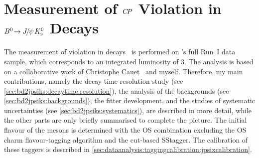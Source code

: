 
\chapter[Measurement of \texorpdfstring{$\CP$}{CP} Violation in
\texorpdfstring{$\BdToJPsiKS$}{Bd2JPsiKS} Decays]{Measurement of
\texorpdfstring{$\CP$}{CP} Violation in
\texorpdfstring{$\BdToJPsiKS$}{Bd2JPsiKS} Decays}
\label{sec:bd2jpsiks}

The measurement of \CP violation in \BdToJPsiKS
decays~\cite{LHCb-PAPER-2015-004} is performed on \lhcb's full Run~I data
sample, which corresponds to an integrated luminosity of \SI{3}{\invfb}. The
analysis is based on a collaborative work of Christophe
Cauet~\cite{Cauet-PhDThesis} and myself. Therefore, my main contributions,
namely the decay time resolution study (see
\cref{sec:bd2jpsiks:decaytime:resolution}), the analysis of the backgrounds
(see \cref{sec:bd2jpsiks:backgrounds}), the fitter development, and the
studies of systematic uncertainties (see \cref{sec:bd2jpsiks:systematics}),
are described in more detail, while the other parts are only briefly
summarised to complete the picture. The initial flavour of the \Bd mesons is
determined with the OS combination excluding the OS charm flavour-tagging
algorithm and the cut-based SS\pion tagger. The calibration of these taggers
is described in \cref{sec:dataanalysis:taggingcalibration:jpsixcalibration}.








